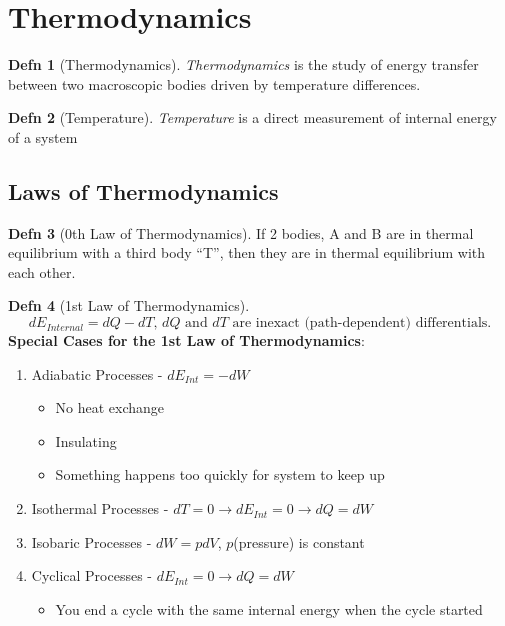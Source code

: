 \documentclass[10pt,letterpaper,final,twoside,notitlepage]{article}
\numberwithin{equation}{section} %
\theoremstyle{definition}
\newtheorem{definition}{Defn}
\theoremstyle{remark}
\begin{document}
\section{Thermodynamics} \label{sec:Thermo}
	\begin{definition}[Thermodynamics] \label{def:Thermo}
		\emph{Thermodynamics} is the study of energy transfer between two macroscopic bodies driven by temperature differences.
	\end{definition}
	\begin{definition}[Temperature] \label{def:Temperature}
		\emph{Temperature} is a direct measurement of internal energy of a system
	\end{definition}

	\subsection*{Laws of Thermodynamics} \label{subsec:Thermo Laws}
		\begin{definition}[0th Law of Thermodynamics] \label{def:0th Law of Thermo}
			If 2 bodies, A and B are in thermal equilibrium with a third body ``T'', then they are in thermal equilibrium with each other.
		\end{definition}
		\begin{definition}[1st Law of Thermodynamics] \label{def:1st Law of Thermo}
			\begin{equation} \label{eq:1st Law of Thermo}
				dE_{Internal} = dQ - dT \text{, } dQ \text{ and } dT \text{ are inexact (path-dependent) differentials.}
			\end{equation}
			\textbf{Special Cases for the 1st Law of Thermodynamics}:
			\begin{enumerate}
				\item Adiabatic Processes - $dE_{Int} = -dW$
				\begin{itemize}[noitemsep, nolistsep]
					\item No heat exchange
					\item Insulating
					\item Something happens too quickly for system to keep up
				\end{itemize}
				\item Isothermal Processes - $dT = 0 \rightarrow dE_{Int} = 0 \rightarrow dQ = dW$
				\item Isobaric Processes - $dW = pdV$, $p$(pressure) is constant
				\item Cyclical Processes - $dE_{Int} = 0 \rightarrow dQ = dW$
				\begin{itemize}[noitemsep, nolistsep]
					\item You end a cycle with the same internal energy when the cycle started
				\end{itemize}
			\end{enumerate}
		\end{definition}
\end{document}
